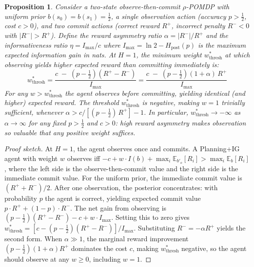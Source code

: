 \documentclass{article}
\newtheorem{proposition}{Proposition}[section]
\begin{document}
\begin{proposition}
\label{prop:nearopt}
Consider a two-state observe-then-commit $\rho$-POMDP with uniform prior $b(s_0){=}b(s_1){=}\tfrac{1}{2}$, a single observation action (accuracy $p > \tfrac{1}{2}$, cost $c > 0$), and two commit actions (correct reward $R^+$, incorrect penalty $R^- < 0$ with $|R^-| > R^+$). Define the reward asymmetry ratio $\alpha = |R^-|/R^+$ and the informativeness ratio $\eta = I_{\max}/c$ where $I_{\max} = \ln 2 - H_{\text{post}}(p)$ is the maximum expected information gain in nats. At $H{=}1$, the minimum weight $w^*_{\mathrm{thresh}}$ at which observing yields higher expected reward than committing immediately is:
\begin{equation*}
    w^*_{\mathrm{thresh}} = \frac{c \;-\; \left(p - \tfrac{1}{2}\right)(R^+ - R^-)}{\,I_{\max}\,} = \frac{c \;-\; \left(p - \tfrac{1}{2}\right)(1 + \alpha)\,R^+}{\,I_{\max}\,}
\end{equation*}
For any $w > w^*_{\mathrm{thresh}}$ the agent observes before committing, yielding identical (and higher) expected reward. The threshold $w^*_{\mathrm{thresh}}$ is negative, making $w{=}1$ trivially sufficient, whenever $\alpha > c / [(p - \tfrac{1}{2})\,R^+] - 1$. In particular, $w^*_{\mathrm{thresh}} \to -\infty$ as $\alpha \to \infty$ for any fixed $p > \tfrac{1}{2}$ and $c > 0$: high reward asymmetry makes observation so valuable that any positive weight suffices.
\end{proposition}
\begin{proof}[Proof sketch]
At $H{=}1$, the agent observes once and commits. A Planning+IG agent with weight $w$ observes iff $-c + w \cdot I(b) + \max_i \mathbb{E}_{b'_o}[R_i] > \max_i \mathbb{E}_b[R_i]$, where the left side is the observe-then-commit value and the right side is the immediate commit value. For the uniform prior, the immediate commit value is $(R^+ + R^-)/2$. After one observation, the posterior concentrates: with probability $p$ the agent is correct, yielding expected commit value $p \cdot R^+ + (1-p) \cdot R^-$. The net gain from observing is $(p - \frac{1}{2})(R^+ - R^-) - c + w \cdot I_{\max}$. Setting this to zero gives $w^*_{\mathrm{thresh}} = [c - (p-\frac{1}{2})(R^+ - R^-)]/I_{\max}$. Substituting $R^- = -\alpha R^+$ yields the second form. When $\alpha \gg 1$, the marginal reward improvement $(p - \frac{1}{2})(1 + \alpha)R^+$ dominates the cost $c$, making $w^*_{\mathrm{thresh}}$ negative, so the agent should observe at any $w \geq 0$, including $w{=}1$.
\end{proof}
\end{document}
